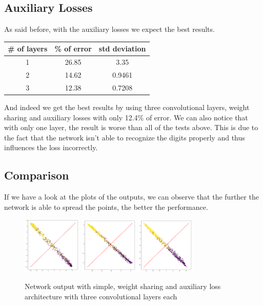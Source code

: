 \documentclass{article}
\begin{document}
\subsection{Auxiliary Losses}

As said before, with the auxiliary losses we expect the best results.

\begin{center}
\begin{tabular}{|c|c|c|}
\hline 
\# of layers & \% of error & std deviation \\ 
\hline 
1 & 26.85 & 3.35 \\ 
\hline 
2 & 14.62 & 0.9461 \\ 
\hline 
3 & 12.38 & 0.7208 \\ 
\hline 
\end{tabular}
\end{center}

And indeed we get the best results by using three convolutional layers, weight sharing and auxiliary losses with only 12.4\% of error. We can also notice that with only one layer, the result is worse than all of the tests above. This is due to the fact that the network isn't able to recognize the digits properly and thus influences the loss incorrectly.

\subsection{Comparison}

If we have a look at the plots of the outputs, we can observe that the further the network is able to spread the points, the better the performance. 

\begin{figure}[H]
\begin{center}
\includegraphics[width=0.25\textwidth]{simple_conv3}
\includegraphics[width=0.25\textwidth]{ws_conv3}
\includegraphics[width=0.25\textwidth]{al_conv3}
\caption{Network output with simple, weight sharing and auxiliary loss architecture with three convolutional layers each}
\end{center}
\end{figure}
\end{document}
